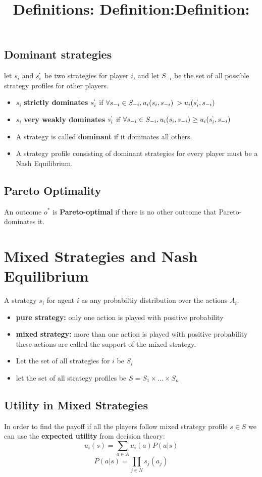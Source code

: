 \documentclass[a4paper,12pt]{article}
\begin{document}
\subsection{Dominant strategies}
let $s_i$ and $s_i^`$ be two strategies for player $i$, and let $S_{-i}$ be the set of all possible strategy profiles for other players.
\bigbreak
\title{\textbf{Definitions:} }
\begin{itemize}
\item $s_i$ \textbf{strictly dominates} $s_i^`$ if $\forall s_{-i} \in S_{-i}, u_i(s_i, s_{-i}) \>> u_i(s_i^`, s_{-i})$
\item $s_i$ \textbf{very weakly dominates} $s_i^`$ if $\forall s_{-i} \in S_{-i}, u_i(s_i, s_{-i}) \geq u_i(s_i^`, s_{-i})$
\item A strategy is called \textbf{dominant} if it dominates all others.
\item A strategy profile consisting of dominant strategies for every player must be a Nash Equilibrium.
\end{itemize}
\subsection{Pareto Optimality}
\title{\textbf{Definition:}}
An outcome $o^*$ is \textbf{Pareto-optimal} if there is no other outcome that Pareto-dominates it.
\section{Mixed Strategies and Nash Equilibrium}
\title{\textbf{Definition:}}
A strategy $s_i$ for agent $i$ as any probabiltiy distribution over the actions $A_i$.
\begin{itemize}
\item \textbf{pure strategy:} only one action is played with positive probability
\item \textbf{mixed strategy:} more than one action is played with positive probability
\bigbreak
these actions are called the support of the mixed strategy.
\item Let the set of all strategies for $i$ be $S_i$
\item let the set of all strategy profiles be $S = S_1 \times... \times S_n$
\end{itemize}
\subsection{Utility in Mixed Strategies}
In order to find the payoff if all the players follow mixed strategy profile $s \in S$ we can use the \textbf{expected utility} from decision theory: 
\begin{equation} u_i(s) = \sum_{a \in A}u_i(a)P(a|s)\end{equation}
\begin{equation} P(a|s) = \prod_{j \in N}s_j(a_j)\end{equation}
\end{document}
